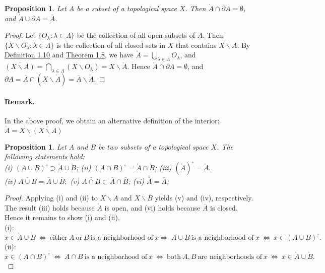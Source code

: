 \documentclass{article}
\numberwithin{equation}{section}
\theoremstyle{plain}
\newtheorem{proposition}[theorem]{Proposition}
\theoremstyle{definition}
\begin{document}
\begin{proposition}\label{prop:1.12}
Let $A$ be a subset of a topological space $X$. Then $\mathring{A}\cap\partial A = \emptyset$, and $\mathring{A}\cup\partial A = \overline{A}$.
\end{proposition}
\begin{proof}
Let $\{O_\lambda:\lambda\in\Lambda\}$ be the collection of all open subsets of $A$. Then $\{X\backslash O_\lambda:\lambda\in\Lambda\}$ is the collection of all closed sets in $X$ that contains $X\backslash A$. By \hyperref[def:1.10]{Definition 1.10} and \hyperref[thm:1.8]{Theorem 1.8}, we have $\mathring{A}=\bigcup_{\lambda\in\Lambda}O_\lambda$, and $\overline{(X\backslash A)}=\bigcap_{\lambda\in\Lambda}(X\backslash O_\lambda) = X\backslash\mathring{A}$. Hence $\mathring{A}\cap\partial A=\emptyset$, and $\partial A = \overline{A}\cap(X\backslash\mathring{A}) = \overline{A}\backslash\mathring{A}$.
\end{proof}

\paragraph{Remark.} In the above proof, we obtain an alternative definition of the interior: $\mathring{A} = X\backslash\overline{(X\backslash A)}$

\begin{proposition}\label{prop:1.13} Let $A$ and $B$ be two subsets of a topological space $X$. The following statements hold:\\
(i) $(A\cup B)^{\circ} \supset \mathring{A}\cup\mathring{B}$; (ii) $(A\cap B)^{\circ} = \mathring{A}\cap\mathring{B}$; (iii) $(\mathring{A})^\circ = \mathring{A}.$\\
(iv) $\overline{A\cup B} = \overline{A}\cup\overline{B};$ (v)  $\overline{A\cap B} \subset \overline{A}\cap\overline{B}$; (vi)  $\overline{\overline{A}} = \overline{A}$;
\end{proposition}
\begin{proof}
Applying (i) and (ii) to $X\backslash A$ and $X\backslash B$ yields (v) and (iv), respectively. The result (iii) holds because $\mathring{A}$ is open, and (vi) holds because $\overline{A}$ is closed. Hence it remains to show (i) and (ii).\\
(i):
$x\in\mathring{A}\cup\mathring{B}\ \Leftrightarrow\ \text{either}\ A\ \text{or}\ B\ \text{is a neighborhood of}\ x \Rightarrow\ A\cup B\ \text{is a neighborhood of}\ x\ \Leftrightarrow\ x\in(A\cup B)^\circ.$\\
(ii):
$x\in(A\cap B)^{\circ}\ \Leftrightarrow\ A\cap B\ \text{is a neighborhood of}\ x\ \Leftrightarrow\ \text{both}\ A, B\ \text{are neighborhoods of}\ x\ \Leftrightarrow\ x\in\mathring{A}\cup\mathring{B}.$
\end{proof}
\end{document}
